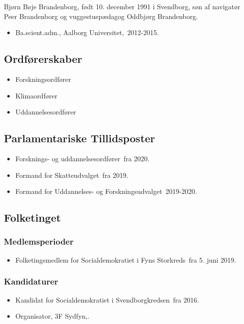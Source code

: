 \documentclass[11pt, a4paper]{awesome-cv}
\begin{document}
\makecvheader[R]
\makelettertitle
\begin{cvletter}
Bjørn Bøje Brandenborg, født 10. december 1991 i Svendborg, søn af navigatør Peer Brandenborg og vuggestuepædagog Oddbjørg Brandenborg.

\begin{itemize}
\item Ba.scient.adm., Aalborg Universitet, 2012-2015.
\end{itemize}
\subsection*{Ordførerskaber}
\begin{itemize}
\item Forskningsordfører
\item Klimaordfører
\item Uddannelsesordfører
\end{itemize}
\subsection*{Parlamentariske Tillidsposter}
\begin{itemize}
\item Forsknings- og uddannelsesordfører fra 2020.
\item Formand for Skatteudvalget fra 2019.
\item Formand for Uddannelses- og Forskningsudvalget 2019-2020.
\end{itemize}
\subsection*{Folketinget}
\subsubsection*{Medlemsperioder}
\begin{itemize}
\item Folketingsmedlem for Socialdemokratiet i Fyns Storkreds fra 5. juni 2019.
\end{itemize}
\subsubsection*{Kandidaturer}
\begin{itemize}
\item Kandidat for Socialdemokratiet i Svendborgkredsen fra 2016.
\end{itemize}
\begin{itemize}
\item Organisator, 3F Sydfyn,.
\end{itemize}
\end{cvletter}
\end{document}

